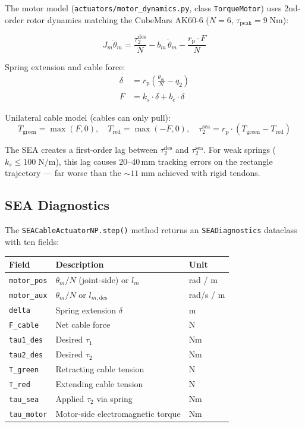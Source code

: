 \documentclass[11pt,a4paper]{article}
\newcommand{\rp}{r_{\mathrm{p}}}
\begin{document}
The motor model (\texttt{actuators/motor\_dynamics.py}, class \texttt{TorqueMotor})
uses 2nd-order rotor dynamics matching the CubeMars AK60-6 ($N=6$, $\tau_{\text{peak}} = 9\;\text{Nm}$):

\begin{equation}
\boxed{
  J_m \ddot{\theta}_m = \frac{\tau_2^{\text{des}}}{N}
  - b_m\,\dot{\theta}_m - \frac{\rp \cdot F}{N}
}
\end{equation}

Spring extension and cable force:
\begin{align}
  \delta &= \rp \left(\frac{\theta_m}{N} - q_2\right) \\
  F &= k_s \cdot \delta + b_c \cdot \dot{\delta}
\end{align}

Unilateral cable model (cables can only pull):
\[
  T_{\text{green}} = \max(F, 0), \quad T_{\text{red}} = \max(-F, 0), \quad
  \tau_2^{\text{sea}} = \rp \cdot (T_{\text{green}} - T_{\text{red}})
\]

\begin{warnbox}
The SEA creates a first-order lag between $\tau_2^{\text{des}}$ and
$\tau_2^{\text{sea}}$.  For weak springs ($k_s \leq 100\;\text{N/m}$),
this lag causes 20--40\,mm tracking errors on the rectangle trajectory
--- far worse than the $\sim 11\;\text{mm}$ achieved with rigid tendons.
\end{warnbox}

\subsection{SEA Diagnostics}

The \texttt{SEACableActuatorNP.step()} method returns an \texttt{SEADiagnostics}
dataclass with ten fields:

\begin{center}
\begin{tabular}{lll}
\toprule
\textbf{Field} & \textbf{Description} & \textbf{Unit} \\
\midrule
\texttt{motor\_pos}  & $\theta_m / N$ (joint-side) or $l_m$  & rad / m \\
\texttt{motor\_aux}  & $\dot{\theta}_m / N$ or $l_{m,\text{des}}$  & rad/s / m \\
\texttt{delta}       & Spring extension $\delta$              & m \\
\texttt{F\_cable}    & Net cable force                        & N \\
\texttt{tau1\_des}   & Desired $\tau_1$                       & Nm \\
\texttt{tau2\_des}   & Desired $\tau_2$                       & Nm \\
\texttt{T\_green}    & Retracting cable tension               & N \\
\texttt{T\_red}      & Extending cable tension                & N \\
\texttt{tau\_sea}    & Applied $\tau_2$ via spring             & Nm \\
\texttt{tau\_motor}  & Motor-side electromagnetic torque       & Nm \\
\bottomrule
\end{tabular}
\end{center}
\end{document}
